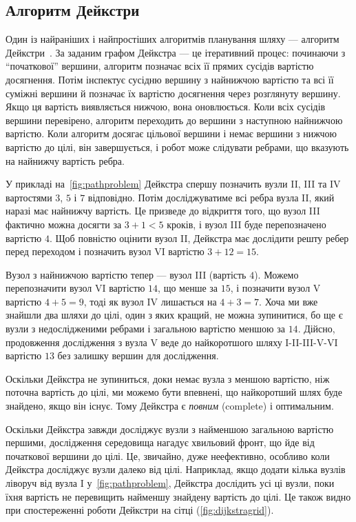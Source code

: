 \subsection{Алгоритм Дейкстри}

Один із найраніших і найпростіших алгоритмів планування шляху — алгоритм Дейкстри~\cite{dijkstra1959note}. За заданим графом Дейкстра — це ітеративний процес: починаючи з ``початкової'' вершини, алгоритм позначає всіх її прямих сусідів вартістю досягнення. Потім інспектує сусідню вершину з найнижчою вартістю та всі її суміжні вершини й позначає їх вартістю досягнення через розглянуту вершину. Якщо ця вартість виявляється нижчою, вона оновлюється. Коли всіх сусідів вершини перевірено, алгоритм переходить до вершини з наступною найнижчою вартістю. Коли алгоритм досягає цільової вершини і немає вершини з нижчою вартістю до цілі, він завершується, і робот може слідувати ребрами, що вказують на найнижчу вартість ребра.

У прикладі на~\cref{fig:pathproblem} Дейкстра спершу позначить вузли II, III та IV вартостями $3$, $5$ і $7$ відповідно. Потім досліджуватиме всі ребра вузла II, який наразі має найнижчу вартість. Це призведе до відкриття того, що вузол III фактично можна досягти за $3+1<5$ кроків, і вузол III буде перепозначено вартістю $4$. Щоб повністю оцінити вузол II, Дейкстра має дослідити решту ребер перед переходом і позначить вузол VI вартістю $3+12=15$.

Вузол з найнижчою вартістю тепер — вузол III (вартість $4$). Можемо перепозначити вузол VI вартістю $14$, що менше за $15$, і позначити вузол V вартістю $4+5=9$, тоді як вузол IV лишається на $4+3=7$. Хоча ми вже знайшли два шляхи до цілі, один з яких кращий, не можна зупинитися, бо ще є вузли з недослідженими ребрами і загальною вартістю меншою за $14$. Дійсно, продовження дослідження з вузла V веде до найкоротшого шляху I-II-III-V-VI вартістю $13$ без залишку вершин для дослідження.

Оскільки Дейкстра не зупиниться, доки немає вузла з меншою вартістю, ніж поточна вартість до цілі, ми можемо бути впевнені, що найкоротший шлях буде знайдено, якщо він існує. Тому Дейкстра є \emph{повним} (complete) і оптимальним.

Оскільки Дейкстра завжди досліджує вузли з найменшою загальною вартістю першими, дослідження середовища нагадує хвильовий фронт, що йде від початкової вершини до цілі. Це, звичайно, дуже неефективно, особливо коли Дейкстра досліджує вузли далеко від цілі.
Наприклад, якщо додати кілька вузлів ліворуч від вузла I у~\cref{fig:pathproblem}, Дейкстра дослідить усі ці вузли, поки їхня вартість не перевищить найменшу знайдену вартість до цілі. Це також видно при спостереженні роботи Дейкстри на сітці (\cref{fig:dijkstragrid}).

